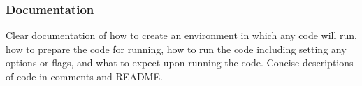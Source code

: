 \documentclass[a4paper, 12pt]{scrartcl}
\begin{document}
    \subsubsection*{Documentation}
    Clear documentation of how to create an environment in which any code will run, how to prepare the code for running, how to run the code including setting any options or flags, and what to expect upon running the code. Concise descriptions of code in comments and README.
    
  
  
  
\end{document}
